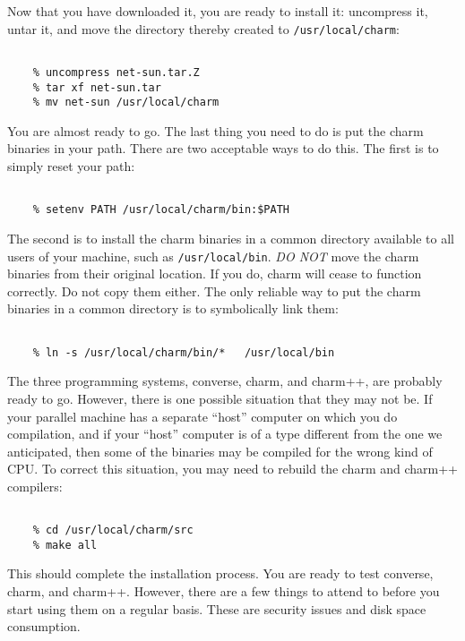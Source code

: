 Now that you have downloaded it, you are ready to install it: uncompress it,
untar it, and move the directory thereby created to {\tt /usr/local/charm}:

\begin{verbatim}

    % uncompress net-sun.tar.Z
    % tar xf net-sun.tar
    % mv net-sun /usr/local/charm

\end{verbatim}

You are almost ready to go.  The last thing you need to do is put the
charm binaries in your path.  There are two acceptable ways to do
this.  The first is to simply reset your path:

\begin{verbatim}

    % setenv PATH /usr/local/charm/bin:$PATH

\end{verbatim}

The second is to install the charm binaries in a common directory available
to all users of your machine, such as {\tt /usr/local/bin}.  {\em DO NOT}
move the charm binaries from their original location.  If you do, charm will
cease to function correctly.  Do not copy them either.  The only reliable
way to put the charm binaries in a common directory is to symbolically link
them:

\begin{verbatim}

    % ln -s /usr/local/charm/bin/*   /usr/local/bin

\end{verbatim}

The three programming systems, converse, charm, and charm++, are
probably ready to go.  However, there is one possible situation that
they may not be.  If your parallel machine has a separate ``host''
computer on which you do compilation, and if your ``host'' computer is
of a type different from the one we anticipated, then some of the
binaries may be compiled for the wrong kind of CPU.  To correct this
situation, you may need to rebuild the charm and charm++ compilers:

\begin{verbatim}

    % cd /usr/local/charm/src
    % make all

\end{verbatim}

This should complete the installation process.  You are ready to test
converse, charm, and charm++.  However, there are a few things to
attend to before you start using them on a regular basis.  These are
security issues and disk space consumption.

